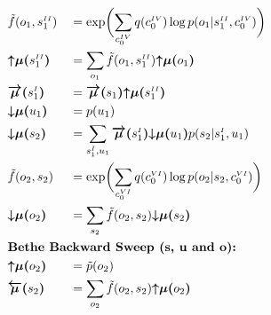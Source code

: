 \documentclass[fleqn]{article}
\begin{document}
\begin{minipage}[t]{0.5\textwidth}
\begin{alignat}{2}
         & \tilde{f}(o_1,s^{\scriptscriptstyle II}_1)                           &  & = \exp \biggl(\sum_{c^{\scriptscriptstyle IV}_0} q(c^{\scriptscriptstyle IV}_0) \log p(o_1|s^{\scriptscriptstyle II}_1,c^{\scriptscriptstyle IV}_0) \biggr)                  \\
         & \bm{{\uparrow}{\mu}(}s^{\scriptscriptstyle II}_1\bm{)}               &  & = \sum_{o_1} \tilde{f}(o_1,s^{\scriptscriptstyle II}_1) \bm{{\uparrow}{\mu}(}o_1\bm{)}                                                                                       \\
         & \bm{\overrightarrow{\mu}(}s^{\scriptscriptstyle I}_1\bm{)}           &  & = \bm{\overrightarrow{\mu}(}s_1\bm{)} \bm{{\uparrow}{\mu}(}s^{\scriptscriptstyle II}_1\bm{)}                                                                                 \\
         & \bm{{\downarrow}{\mu}(}u_1\bm{)}                                     &  & = p(u_1)                                                                                                                                                                     \\
         & \bm{{\downarrow}{\mu}(}s_2\bm{)}                                     &  & = \sum_{s^{\scriptscriptstyle I}_1, u_1} \bm{\overrightarrow{\mu}(}s^{\scriptscriptstyle I}_1\bm{)} \bm{{\downarrow}{\mu}(}u_1\bm{)} p(s_2|{s^{\scriptscriptstyle I}_1},u_1) \\
         & \tilde{f}(o_2,s_2)                                                   &  & = \exp \biggl(\sum_{c^{\scriptscriptstyle VI}_0} q(c^{\scriptscriptstyle VI}_0) \log p(o_2|s_2,c^{\scriptscriptstyle VI}_0) \biggr)                                          \\
         & \bm{{\downarrow}{\mu}(}o_2\bm{)}                                     &  & = \sum_{s_2} \tilde{f}(o_2,s_2) \bm{{\downarrow}{\mu}(}s_2\bm{)}                                                                                                             \\
         & \rlap{\text{\bfseries Bethe Backward Sweep (s, u and o):}} \nonumber                                                                                                                                                                                   \\
         & \bm{{\uparrow}{\mu}(}o_2\bm{)}                                       &  & = \tilde{p}(o_2)                                                                                                                                                             \\
         & \bm{\overleftarrow{\mu}(}s_2\bm{)}                                   &  & = \sum_{o_2} \tilde{f}(o_2,s_2) \bm{{\uparrow}{\mu}(}o_2\bm{)}
    \end{alignat}
\end{minipage}%
\end{document}
